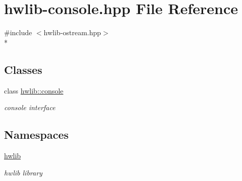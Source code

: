 \hypertarget{hwlib-console_8hpp}{}\section{hwlib-\/console.hpp File Reference}
\label{hwlib-console_8hpp}
{\ttfamily \#include $<$hwlib-\/ostream.\+hpp$>$}\\*
\subsection*{Classes}
\begin{DoxyCompactItemize}
\item 
class \hyperlink{classhwlib_1_1console}{hwlib\+::console}
\begin{DoxyCompactList}\small\item\em console interface \end{DoxyCompactList}\end{DoxyCompactItemize}
\subsection*{Namespaces}
\begin{DoxyCompactItemize}
\item 
 \hyperlink{namespacehwlib}{hwlib}
\begin{DoxyCompactList}\small\item\em hwlib library \end{DoxyCompactList}\end{DoxyCompactItemize}
